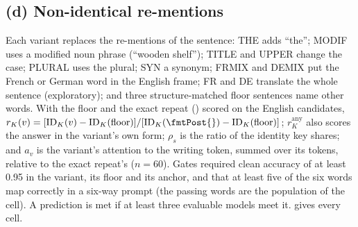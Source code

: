 \subsection{(d) Non-identical re-mentions}\label{app:g-forms}

Each variant replaces the re-mentions of the \fmtPost{} sentence: THE adds ``the''; MODIF uses a modified noun phrase (``wooden shelf''); TITLE and UPPER change the case; PLURAL uses the plural; SYN a synonym; FRMIX and DEMIX put the French or German word in the English frame; FR and DE translate the whole sentence (exploratory); and three structure-matched floor sentences name other words. With the floor and the exact repeat (\fmtPost{}) scored on the English candidates, $r_K(v) = [\mathrm{ID}_K(v) - \mathrm{ID}_K(\text{floor})]/[\mathrm{ID}_K(\text{\fmtPost{}}) - \mathrm{ID}_K(\text{floor})]$; $r_K^{\mathrm{any}}$ also scores the answer in the variant's own form; $\rho_s$ is the ratio of the identity key shares; and $a_v$ is the variant's attention to the writing token, summed over its tokens, relative to the exact repeat's ($n = 60$). Gates required clean accuracy of at least 0.95 in the variant, its floor and its anchor, and that at least five of the six words map correctly in a six-way prompt (the passing words are the population of the cell). A prediction is met if at least three evaluable models meet it.  gives every cell.

\begin{table}[!ht]
\centering
\caption{\textbf{Non-identical re-mentions} (preregistration G, part (d)). $r_K$: key identity relative to an exact repeat, above a structure-matched floor, on the English candidates; $r_K^{\mathrm{any}}$: the same with the answer also scored in the variant's own form; $a_v$: attention of the re-mention to the writing token relative to the exact repeat, summed over the re-mention's tokens ($n = 60$). $n = 150$ cores per cell before the per-word competence gate; DEMIX and DE cover fewer cores. THE, MODIF, TITLE, UPPER, PLURAL, SYN, FRMIX and DEMIX enter G13--G16; FR, DE and the list variant are exploratory.}
\label{tab:variants}
\resizebox{\textwidth}{!}{}
\end{table}

